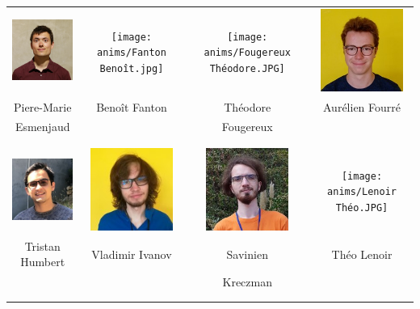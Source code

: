 \begin{center}
\begin{tabular}{cccc}
\includegraphics[angle=0,origin=c, width=27mm]{anims/Esmanjaud Pierre-Marie.JPG} &
\texttt{[image: anims/Fanton Benoît.jpg]} &
\texttt{[image: anims/Fougereux Théodore.JPG]} &
\includegraphics[angle=0,origin=c, width=27mm]{anims/Fourré Aurélien.jpg} \\
Piere-Marie & Benoît Fanton & Théodore & Aurélien Fourré \\ Esmenjaud & & Fougereux & \\ \\ \\

\includegraphics[angle=0,origin=c, width=27mm]{anims/Humbert Tristan.JPG} &
\includegraphics[angle=0,origin=c, width=27mm]{anims/Ivanov Vladimir.jpg} &
\includegraphics[angle=0,origin=c, width=27mm]{anims/Kreczman Savinien.jpg} &
\texttt{[image: anims/Lenoir Théo.JPG]} \\
Tristan Humbert & Vladimir Ivanov & Savinien & Théo Lenoir \\ & & Kreczman & \\ \\ \\

\end{tabular}
\end{center}
\pagebreak

